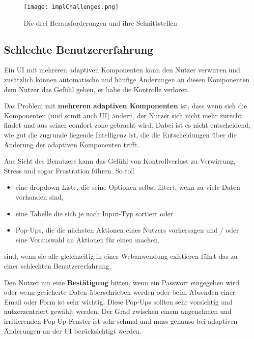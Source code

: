 \begin{figure}[h]
    \centering
    \texttt{[image: implChallenges.png]}
    \caption{Die drei Herausforderungen und ihre Schnittstellen}
\end{figure}

\subsection{Schlechte Benutzererfahrung}
Ein UI mit mehreren adaptiven Komponenten kann den Nutzer verwirren und zusätzlich können automatische
und häufige Änderungen an diesen Komponenten dem Nutzer das Gefühl geben, er habe die Kontrolle verloren.

Das Problem mit \textbf{mehreren adaptiven Komponenten} ist, dass wenn sich die Komponenten
(und somit auch UI) ändern, der Nutzer sich nicht mehr zurecht findet und aus seiner comfort
zone gebracht wird. Dabei ist es nicht entscheidend, wie gut die zugrunde liegende Intelligenz ist,
die die Entscheidungen über die Änderung der adaptiven Komponenten trifft.

Aus Sicht des Benutzers kann das Gefühl von Kontrollverlust zu Verwirrung, Stress und sogar Frustration führen. So toll
\begin{itemize}
    \item eine dropdown Liste, die seine Optionen selbst filtert, wenn zu viele Daten vorhanden sind,
    \item eine Tabelle die sich je nach Input-Typ sortiert oder
    \item Pop-Ups, die die nächsten Aktionen eines Nutzers vorhersagen und / oder eine Vorauswahl an Aktionen für einen machen,
\end{itemize}
sind, wenn sie alle gleichzeitig in einer Webanwendung existieren führt das zu einer schlechten Benutzererfahrung.

Den Nutzer um eine \textbf{Bestätigung} bitten, wenn ein Passwort eingegeben wird oder wenn gesicherte Daten
überschrieben werden oder beim Absenden einer Email oder Form ist sehr wichtig.
Diese Pop-Ups sollten sehr vorsichtig und nutzerzentriert gewählt werden. Der Grad zwischen einem
angenehmen und irritierenden Pop-Up Fenster ist sehr schmal und muss genauso bei adaptiven Änderungen
an der UI berücksichtigt werden.

